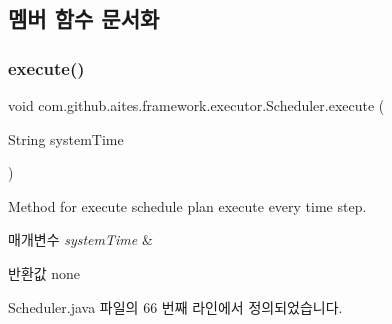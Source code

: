 \subsection{멤버 함수 문서화}
\mbox{\label{classcom_1_1github_1_1aites_1_1framework_1_1executor_1_1_scheduler_a92aea0b2dfeb8a54321a6a1a8a081837}} 
\subsubsection{\texorpdfstring{execute()}{execute()}}
{\footnotesize\ttfamily void com.\+github.\+aites.\+framework.\+executor.\+Scheduler.\+execute (\begin{DoxyParamCaption}\item[{String}]{system\+Time }\end{DoxyParamCaption})}



Method for execute schedule plan execute every time step. 


\begin{DoxyParams}{매개변수}
{\em system\+Time} & \\
\hline
\end{DoxyParams}
\begin{DoxyReturn}{반환값}
none 
\end{DoxyReturn}


Scheduler.\+java 파일의 66 번째 라인에서 정의되었습니다.


